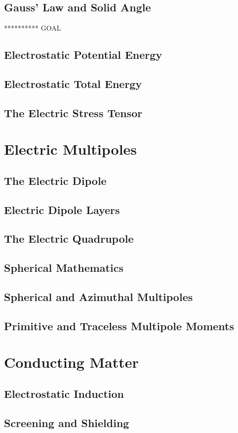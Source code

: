 \documentclass[12pt]{article}
\theoremstyle{plain}
\theoremstyle{definition}
\begin{document}
\subsection{Gauss' Law and Solid Angle}

********** GOAL

\subsection{Electrostatic Potential Energy}

\subsection{Electrostatic Total Energy}

\subsection{The Electric Stress Tensor}

\section{Electric Multipoles}

\subsection{The Electric Dipole}

\subsection{Electric Dipole Layers}

\subsection{The Electric Quadrupole}

\subsection{Spherical Mathematics}

\subsection{Spherical and Azimuthal Multipoles}

\subsection{Primitive and Traceless Multipole Moments}

\section{Conducting Matter}

\subsection{Electrostatic Induction}

\subsection{Screening and Shielding}
\end{document}
